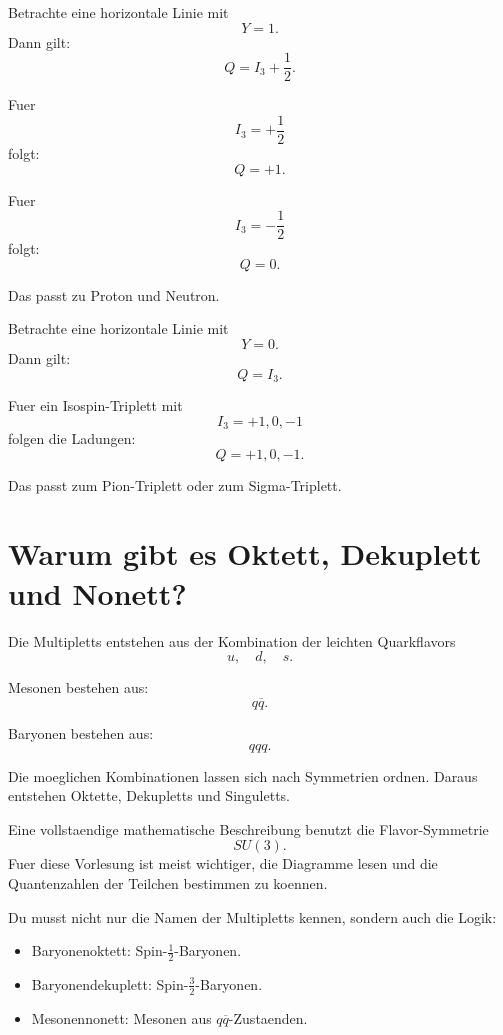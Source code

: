 \begin{examplebox}
Betrachte eine horizontale Linie mit
\[
    Y=1.
\]
Dann gilt:
\[
    Q=I_3+\frac{1}{2}.
\]

Fuer
\[
    I_3=+\frac{1}{2}
\]
folgt:
\[
    Q=+1.
\]

Fuer
\[
    I_3=-\frac{1}{2}
\]
folgt:
\[
    Q=0.
\]

Das passt zu Proton und Neutron.
\end{examplebox}

\begin{examplebox}
Betrachte eine horizontale Linie mit
\[
    Y=0.
\]
Dann gilt:
\[
    Q=I_3.
\]

Fuer ein Isospin-Triplett mit
\[
    I_3=+1,0,-1
\]
folgen die Ladungen:
\[
    Q=+1,0,-1.
\]

Das passt zum Pion-Triplett oder zum Sigma-Triplett.
\end{examplebox}

\section{Warum gibt es Oktett, Dekuplett und Nonett?}

\begin{conceptbox}
Die Multipletts entstehen aus der Kombination der leichten Quarkflavors
\[
    u,\quad d,\quad s.
\]

Mesonen bestehen aus:
\[
    q\overline{q}.
\]

Baryonen bestehen aus:
\[
    qqq.
\]

Die moeglichen Kombinationen lassen sich nach Symmetrien ordnen.
Daraus entstehen Oktette, Dekupletts und Singuletts.
\end{conceptbox}

\begin{notebox}
Eine vollstaendige mathematische Beschreibung benutzt die Flavor-Symmetrie
\[
    SU(3).
\]
Fuer diese Vorlesung ist meist wichtiger, die Diagramme lesen und die Quantenzahlen
der Teilchen bestimmen zu koennen.
\end{notebox}

\begin{examtipbox}
Du musst nicht nur die Namen der Multipletts kennen, sondern auch die Logik:
\begin{itemize}
    \item Baryonenoktett: Spin-$\frac{1}{2}$-Baryonen.
    \item Baryonendekuplett: Spin-$\frac{3}{2}$-Baryonen.
    \item Mesonennonett: Mesonen aus $q\overline{q}$-Zustaenden.
\end{itemize}
\end{examtipbox}


